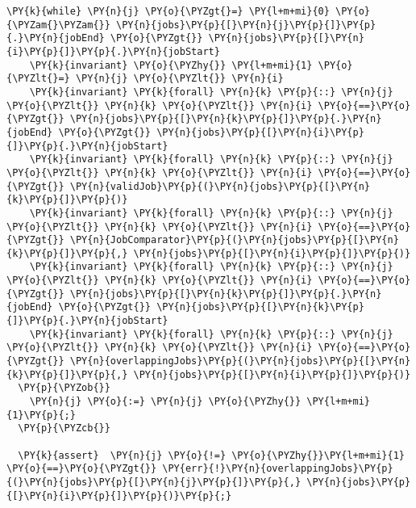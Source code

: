 \begin{Verbatim}[commandchars=\\\{\}, fontsize=\footnotesize]
  \PY{k}{while} \PY{n}{j} \PY{o}{\PYZgt{}=} \PY{l+m+mi}{0} \PY{o}{\PYZam{}\PYZam{}} \PY{n}{jobs}\PY{p}{[}\PY{n}{j}\PY{p}{]}\PY{p}{.}\PY{n}{jobEnd} \PY{o}{\PYZgt{}} \PY{n}{jobs}\PY{p}{[}\PY{n}{i}\PY{p}{]}\PY{p}{.}\PY{n}{jobStart} 
    \PY{k}{invariant} \PY{o}{\PYZhy{}} \PY{l+m+mi}{1} \PY{o}{\PYZlt{}=} \PY{n}{j} \PY{o}{\PYZlt{}} \PY{n}{i}
    \PY{k}{invariant} \PY{k}{forall} \PY{n}{k} \PY{p}{::} \PY{n}{j} \PY{o}{\PYZlt{}} \PY{n}{k} \PY{o}{\PYZlt{}} \PY{n}{i} \PY{o}{==}\PY{o}{\PYZgt{}} \PY{n}{jobs}\PY{p}{[}\PY{n}{k}\PY{p}{]}\PY{p}{.}\PY{n}{jobEnd} \PY{o}{\PYZgt{}} \PY{n}{jobs}\PY{p}{[}\PY{n}{i}\PY{p}{]}\PY{p}{.}\PY{n}{jobStart} 
    \PY{k}{invariant} \PY{k}{forall} \PY{n}{k} \PY{p}{::} \PY{n}{j} \PY{o}{\PYZlt{}} \PY{n}{k} \PY{o}{\PYZlt{}} \PY{n}{i} \PY{o}{==}\PY{o}{\PYZgt{}} \PY{n}{validJob}\PY{p}{(}\PY{n}{jobs}\PY{p}{[}\PY{n}{k}\PY{p}{]}\PY{p}{)}
    \PY{k}{invariant} \PY{k}{forall} \PY{n}{k} \PY{p}{::} \PY{n}{j} \PY{o}{\PYZlt{}} \PY{n}{k} \PY{o}{\PYZlt{}} \PY{n}{i} \PY{o}{==}\PY{o}{\PYZgt{}} \PY{n}{JobComparator}\PY{p}{(}\PY{n}{jobs}\PY{p}{[}\PY{n}{k}\PY{p}{]}\PY{p}{,} \PY{n}{jobs}\PY{p}{[}\PY{n}{i}\PY{p}{]}\PY{p}{)}
    \PY{k}{invariant} \PY{k}{forall} \PY{n}{k} \PY{p}{::} \PY{n}{j} \PY{o}{\PYZlt{}} \PY{n}{k} \PY{o}{\PYZlt{}} \PY{n}{i} \PY{o}{==}\PY{o}{\PYZgt{}} \PY{n}{jobs}\PY{p}{[}\PY{n}{k}\PY{p}{]}\PY{p}{.}\PY{n}{jobEnd} \PY{o}{\PYZgt{}} \PY{n}{jobs}\PY{p}{[}\PY{n}{k}\PY{p}{]}\PY{p}{.}\PY{n}{jobStart} 
    \PY{k}{invariant} \PY{k}{forall} \PY{n}{k} \PY{p}{::} \PY{n}{j} \PY{o}{\PYZlt{}} \PY{n}{k} \PY{o}{\PYZlt{}} \PY{n}{i} \PY{o}{==}\PY{o}{\PYZgt{}} \PY{n}{overlappingJobs}\PY{p}{(}\PY{n}{jobs}\PY{p}{[}\PY{n}{k}\PY{p}{]}\PY{p}{,} \PY{n}{jobs}\PY{p}{[}\PY{n}{i}\PY{p}{]}\PY{p}{)}
  \PY{p}{\PYZob{}}
    \PY{n}{j} \PY{o}{:=} \PY{n}{j} \PY{o}{\PYZhy{}} \PY{l+m+mi}{1}\PY{p}{;}
  \PY{p}{\PYZcb{}}

  \PY{k}{assert}  \PY{n}{j} \PY{o}{!=} \PY{o}{\PYZhy{}}\PY{l+m+mi}{1} \PY{o}{==}\PY{o}{\PYZgt{}} \PY{err}{!}\PY{n}{overlappingJobs}\PY{p}{(}\PY{n}{jobs}\PY{p}{[}\PY{n}{j}\PY{p}{]}\PY{p}{,} \PY{n}{jobs}\PY{p}{[}\PY{n}{i}\PY{p}{]}\PY{p}{)}\PY{p}{;}


\end{Verbatim}
